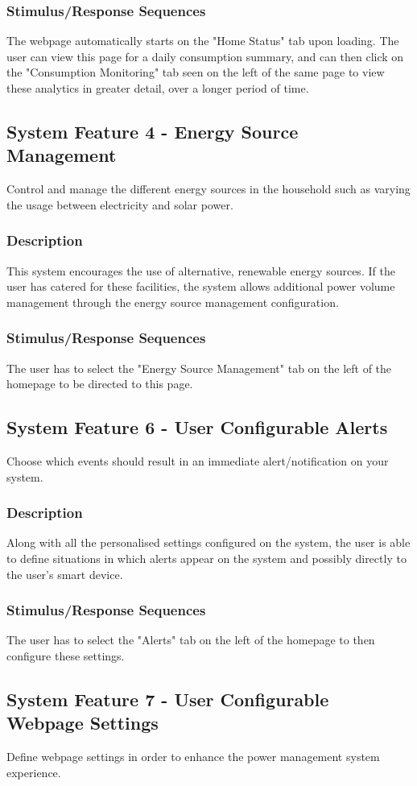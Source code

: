 \documentclass[11pt, a4paper]{article}
\begin{document}
	\subsubsection{Stimulus/Response Sequences}
	The webpage automatically starts on the "Home Status" tab upon loading. The user can view this page for a daily consumption summary, and can then click on the "Consumption Monitoring" tab seen on the left of the same page to view these analytics in greater detail, over a longer period of time.
	\subsection{System Feature 4 - Energy Source Management}
	Control and manage the different energy sources in the household such as varying the usage between electricity and solar power. 
	\subsubsection{Description}
	This system encourages the use of alternative, renewable energy sources. If the user has catered for these facilities, the system allows additional power volume management through the energy source management configuration. 
	\subsubsection{Stimulus/Response Sequences}
	The user has to select the "Energy Source Management" tab on the left of the homepage to be directed to this page. 
	\subsection{System Feature 6 - User Configurable Alerts} 
	Choose which events should result in an immediate alert/notification on your system. 
	\subsubsection{Description}
	Along with all the personalised settings configured on the system, the user is able to define situations in which alerts appear on the system and possibly directly to the user's smart device. 
	\subsubsection{Stimulus/Response Sequences}
	The user has to select the "Alerts" tab on the left of the homepage to then configure these settings.
	\subsection{System Feature 7 - User Configurable Webpage Settings} 
	Define webpage settings in order to enhance the power management system experience.
\end{document}
